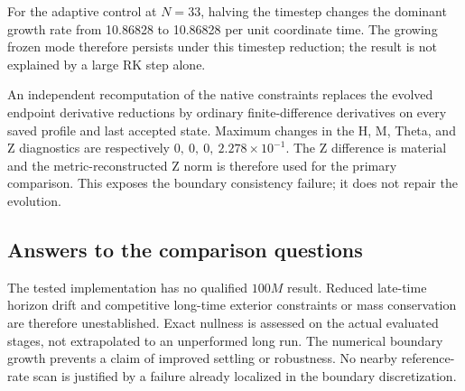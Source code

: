 For the adaptive control at $N=33$, halving the timestep changes the dominant growth rate from 10.86828 to 10.86828 per unit coordinate time. The growing frozen mode therefore persists under this timestep reduction; the result is not explained by a large RK step alone.

An independent recomputation of the native constraints replaces the evolved endpoint derivative reductions by ordinary finite-difference derivatives on every saved profile and last accepted state. Maximum changes in the H, M, Theta, and Z diagnostics are respectively $0,\ 0,\ 0,\ 2.278\times10^{-1}$. The Z difference is material and the metric-reconstructed Z norm is therefore used for the primary comparison. This exposes the boundary consistency failure; it does not repair the evolution.

\subsection{Answers to the comparison questions}

The tested implementation has no qualified $100M$ result. Reduced late-time horizon drift and competitive long-time exterior constraints or mass conservation are therefore unestablished. Exact nullness is assessed on the actual evaluated stages, not extrapolated to an unperformed long run. The numerical boundary growth prevents a claim of improved settling or robustness. No nearby reference-rate scan is justified by a failure already localized in the boundary discretization.
